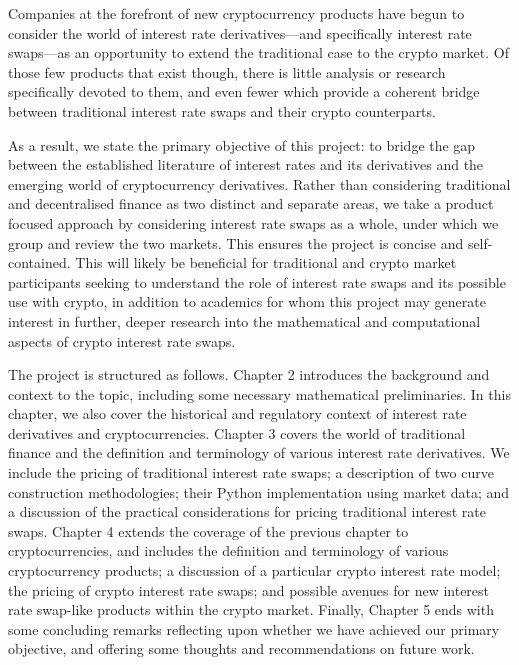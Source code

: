 Companies at the forefront of new cryptocurrency products have begun to consider the world of interest rate derivatives––and specifically interest rate swaps––as an opportunity to extend the traditional case to the crypto market. Of those few products that exist though, there is little analysis or research specifically devoted to them, and even fewer which provide a coherent bridge between traditional interest rate swaps and their crypto counterparts.

As a result, we state the primary objective of this project: to bridge the gap between the established literature of interest rates and its derivatives and the emerging world of cryptocurrency derivatives. Rather than considering traditional and decentralised finance as two distinct and separate areas, we take a product focused approach by considering interest rate swaps as a whole, under which we group and review the two markets. This ensures the project is concise and self-contained. This will likely be beneficial for traditional and crypto market participants seeking to understand the role of interest rate swaps and its possible use with crypto, in addition to academics for whom this project may generate interest in further, deeper research into the mathematical and computational aspects of crypto interest rate swaps.

The project is structured as follows. Chapter 2 introduces the background and context to the topic, including some necessary mathematical preliminaries. In this chapter, we also cover the historical and regulatory context of interest rate derivatives and cryptocurrencies. Chapter 3 covers the world of traditional finance and the definition and terminology of various interest rate derivatives. We include the pricing of traditional interest rate swaps; a description of two curve construction methodologies; their Python implementation using market data; and a discussion of the practical considerations for pricing traditional interest rate swaps. Chapter 4 extends the coverage of the previous chapter to cryptocurrencies, and includes the definition and terminology of various cryptocurrency products; a  discussion of a particular crypto interest rate model; the pricing of crypto interest rate swaps; and possible avenues for new interest rate swap-like products within the crypto market. Finally, Chapter 5 ends with some concluding remarks reflecting upon whether we have achieved our primary objective, and offering some thoughts and recommendations on future work. 